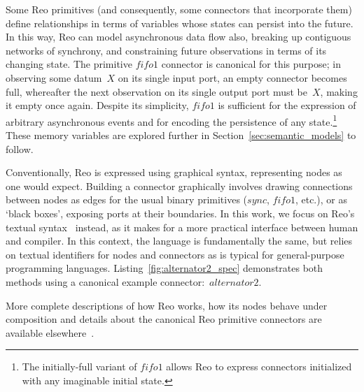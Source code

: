 Some Reo primitives (and consequently, some connectors that incorporate them) define relationships in terms of variables whose states can persist into the future. In this way, Reo can model asynchronous data flow also, breaking up contiguous networks of synchrony, and constraining future observations in terms of its changing state. The primitive $fifo1$ connector is canonical for this purpose; in observing some datum~$X$ on its single input port, an empty connector becomes full, whereafter the next observation on its single output port must be~$X$, making it empty once again. Despite its simplicity, $fifo1$ is sufficient for the expression of arbitrary asynchronous events and for encoding the persistence of any state.\footnote{The initially-full variant of $fifo1$ allows Reo to express connectors initialized with any imaginable initial state.} These memory variables are explored further in Section~\ref{sec:semantic_models} to follow.

Conventionally, Reo is expressed using graphical syntax, representing nodes as one would expect. Building a connector graphically involves drawing connections between nodes as edges for the usual binary primitives ($sync$, $fifo1$, etc.), or as `black boxes', exposing ports at their boundaries. In this work, we focus on Reo's textual syntax~\cite{dokter2018treo} instead, as it makes for a more practical interface between human and compiler. In this context, the language is fundamentally the same, but relies on textual identifiers for nodes and connectors as is typical for general-purpose programming languages. Listing~\ref{fig:alternator2_spec} demonstrates both methods using a canonical example connector:~$alternator2$.

More complete descriptions of how Reo works, how its nodes behave under composition and details about the canonical Reo primitive connectors are available elsewhere~\cite{arbab2004modeling, arbab2005abstract, arbab2011puff}.



